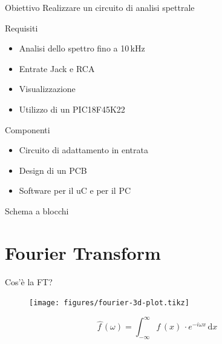 \documentclass[10pt, xetex]{beamer}
\newcommand{\dd}[1]{\mathrm{d}#1}
\begin{document}
\begin{frame}{Obiettivo}
    Realizzare un circuito di analisi spettrale
    \begin{block}{Requisiti}
    \begin{itemize}
        \item Analisi dello spettro fino a 10\,kHz
        \item Entrate Jack e RCA
        \item Visualizzazione 
        \item Utilizzo di un PIC18F45K22
    \end{itemize}
    \end{block}
    
    \pause
    \begin{block}{Componenti}
    \begin{itemize}
        \item Circuito di adattamento in entrata
        \item Design di un PCB
        \item Software per il uC e per il PC
    \end{itemize}
    \end{block}
\end{frame}

\begin{frame}{Schema a blocchi}
    \begin{figure} \centering
    \end{figure}
\end{frame}

\section{Fourier Transform}
\begin{frame}{Cos'\`e la FT?}
    \begin{figure} \centering
        \texttt{[image: figures/fourier-3d-plot.tikz]}
    \end{figure}
    \[
        \hat{f\,} (\omega) 
        = \int_{-\infty}^\infty f\,(x)\,\cdot e^{-i\omega x}\,\dd{x}
    \]
\end{frame}

\end{document}
